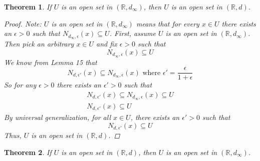 \documentclass{amsart}
\newtheorem{theorem}{Theorem}
\begin{document}
\begin{enumerate}[1.]
\begin{theorem}
	If $U$ is an open set in $(\mathbb{R},d_\infty)$, then $U$ is an open set in $(\mathbb{R},d)$.
	\begin{proof}
		Note: $U$ is an open set in $(\mathbb{R},d_\infty)$ means that for every $x \in U$ there exists an
		$\epsilon > 0$ such that $N_{d_\infty,\epsilon}(x) \subseteq U$.
		First, assume $U$ is an open set in $(\mathbb{R},d_\infty)$. Then pick an arbitrary $x \in U$ and fix $\epsilon > 0$ such that
		\[
			N_{d_\infty,\epsilon}(x) \subseteq U
		\]
		We know from Lemma 15 that
		\[
			N_{d,\epsilon'}(x) \subseteq N_{d_\infty,\epsilon}(x) \text{ where } \epsilon' = \frac{\epsilon}{1 + \epsilon}
		\]
		So for any $\epsilon > 0$ there exists an $\epsilon' > 0$ such that
		\begin{align*}
			N_{d,\epsilon'}(x) \subseteq N_{d_\infty,\epsilon}(x) \subseteq U \\
			N_{d,\epsilon'}(x) \subseteq U
		\end{align*}
		By universal generalization, for all $x \in U$, there exists an $\epsilon' > 0$ such that 
		\[
			N_{d,\epsilon'}(x) \subseteq U
		\]
		Thus, $U$ is an open set in $(\mathbb{R},d)$.
	\end{proof}
\end{theorem}
\begin{theorem}
	If $U$ is an open set in $(\mathbb{R},d)$, then $U$ is an open set in $(\mathbb{R},d_\infty)$.

\end{theorem}
\end{enumerate}
\end{document}
